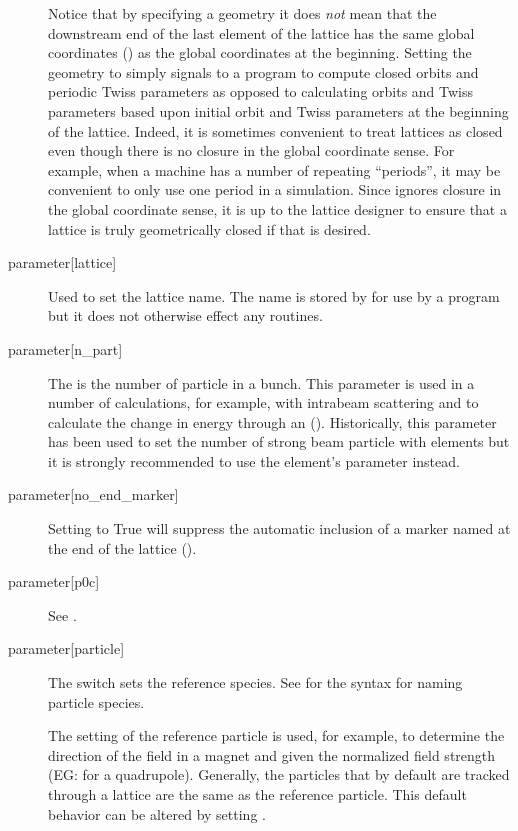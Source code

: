 \begin{description}
Notice that by specifying a  geometry it does {\em not} mean that the downstream end of
the last element of the lattice has the same global coordinates () as the global
coordinates at the beginning. Setting the geometry to  simply signals to a program to
compute closed orbits and periodic Twiss parameters as opposed to calculating orbits and Twiss
parameters based upon initial orbit and Twiss parameters at the beginning of the lattice.  Indeed,
it is sometimes convenient to treat lattices as closed even though there is no closure in the global
coordinate sense. For example, when a machine has a number of repeating ``periods'', it may be
convenient to only use one period in a simulation. Since \bmad ignores closure in the global
coordinate sense, it is up to the lattice designer to ensure that a lattice is truly geometrically
closed if that is desired.
%
  \item[{parameter[lattice]}] \Newline
Used to set the lattice name. The  name is stored by \bmad for use by a program but it
does not otherwise effect any \bmad routines.
%
  \item[{parameter[n_part]}] \Newline
The  is the number of particle in a bunch. This parameter is used in a number
of calculations, for example, with intrabeam scattering and to calculate the change in energy
through an  (). Historically, this parameter has been used to set the
number of strong beam particle with  elements but it is strongly recommended to use
the  element's  parameter instead.
%
  \item[{parameter[no_end_marker]}] \Newline
Setting  to True will suppress the automatic inclusion
of a marker named  at the end of the lattice (). 
%
  \item[{parameter[p0c]}] \Newline
See .
%
  \item[{parameter[particle]}] \Newline
The  switch sets the reference species. See  for the
syntax for naming particle species.

The setting of the reference particle is used, for example, to determine the direction of the field
in a magnet and given the normalized field strength (EG:  for a quadrupole).  Generally, the
particles that by default are tracked through a lattice are the same as the reference particle. This
default behavior can be altered by setting .


\end{description}
